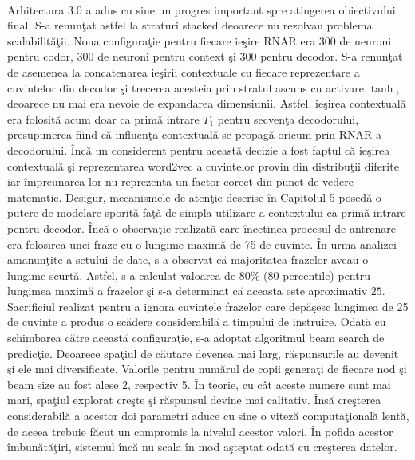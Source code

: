 \paragraph{}
Arhitectura 3.0 a adus cu sine un progres important spre atingerea obiectivului final. S-a renun\c tat astfel la straturi stacked deoarece nu rezolvau problema scalabilit\u a\c tii. Noua configura\c tie pentru fiecare ie\c sire RNAR era 300 de neuroni pentru codor, 300 de neuroni pentru context \c si 300 pentru decodor. S-a renun\c tat de asemenea la concatenarea ie\c sirii contextuale cu fiecare reprezentare a cuvintelor din decodor \c si trecerea acesteia prin stratul ascuns cu activare \(\tanh\), deoarece nu mai era nevoie de expandarea dimensiunii. Astfel, ie\c sirea contextual\u a era folosit\u a acum doar ca prim\u a intrare \(T_1\) pentru secven\c ta decodorului, presupunerea fiind c\u a influen\c ta contextual\u a se propag\u a oricum prin RNAR a decodorului. \^ Inc\u a un considerent pentru aceast\u a decizie a fost faptul c\u a ie\c sirea contextual\u a \c si reprezentarea word2vec a cuvintelor provin din distribu\c tii diferite iar \^ impreunarea lor nu reprezenta un factor corect din punct de vedere matematic. Desigur, mecanismele de aten\c tie descrise \^ in Capitolul 5 posed\u a o putere de modelare sporit\u a fa\c t\u a de simpla utilizare a contextului ca prim\u a intrare pentru decodor. \^ Inc\u a o observa\c tie realizat\u a care \^ incetinea procesul de antrenare era folosirea unei fraze cu o lungime maxim\u a de 75 de cuvinte. \^ In urma analizei amanun\c tite a setului de date, s-a observat c\u a majoritatea frazelor aveau o lungime scurt\u a. Astfel, s-a calculat valoarea de \(80\%\) (80 percentile) pentru lungimea maxim\u a a frazelor \c si s-a determinat c\u a aceasta este aproximativ \(25\). Sacrificiul realizat pentru a ignora cuvintele frazelor care dep\u a\c sesc lungimea de 25 de cuvinte a produs o sc\u adere considerabil\u a a timpului de instruire. Odat\u a cu schimbarea c\u atre aceast\u a configura\c tie, s-a adoptat algoritmul beam search de predic\c tie. Deoarece spa\c tiul de c\u autare devenea mai larg, r\u aspunsurile au devenit \c si ele mai diversificate. Valorile pentru num\u arul de copii genera\c ti de fiecare nod \c si beam size au fost alese 2, respectiv 5. \^ In teorie, cu c\^ at aceste numere sunt mai mari, spa\c tiul explorat cre\c ste \c si r\u aspunsul devine mai calitativ. \^ Ins\u a cre\c sterea considerabil\u a a acestor doi parametri aduce cu sine o vitez\u a computa\c tional\u a lent\u a, de aceea trebuie f\u acut un compromis la nivelul acestor valori. \^ In pofida acestor \^ imbun\u at\u a\c tiri, sistemul \^ inc\u a nu scala \^ in mod a\c steptat odat\u a cu cre\c sterea datelor.

